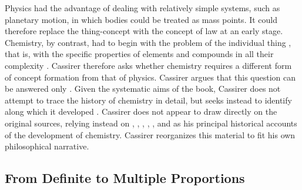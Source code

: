 \documentclass[submitted,12pt]{article}
\begin{document}
Physics had the advantage of dealing with relatively simple systems, such as planetary motion, in which bodies could be treated as  mass points. It could therefore replace the thing-concept  with the concept of law  at an early stage. Chemistry, by contrast, had to begin with the problem of the individual thing , that is, with the specific properties of elements and compounds in all their complexity . Cassirer therefore asks whether chemistry requires a different form of concept formation from that of physics. Cassirer argues that this question can be answered only  . Given the systematic aims of the book, Cassirer does not attempt to trace the history of chemistry in detail, but seeks instead to identify  along which it developed .  Cassirer does not appear to draw directly on the original sources, relying instead on \citet{Wurtz1879}, \citet{Meyer1884}, \citet{Berthelot1885}, \citet{Ladenburg1902}, \citet{Duhem1902}, and \citet{Ostwald1906Leitlinien} as his principal historical accounts of the development of chemistry. Cassirer reorganizes this material to fit his own philosophical narrative. 

\subsection{From Definite to Multiple Proportions}
\end{document}
